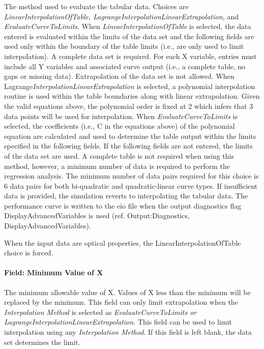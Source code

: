 The method used to evaluate the tabular data. Choices are \emph{LinearInterpolationOfTable, LagrangeInterpolationLinearExtrapolation,} and \emph{EvaluateCurveToLimits}. When \emph{LinearInterpolationOfTable} is selected, the data entered is evaluated within the limits of the data set and the following fields are used only within the boundary of the table limits (i.e., are only used to limit interpolation). A complete data set is required. For each X variable, entries must include all Y variables and associated curve output (i.e., a complete table, no gaps or missing data). Extrapolation of the data set is not allowed. When Lagrange\emph{InterpolationLinearExtrapolation} is selected, a polynomial interpolation routine is used within the table boundaries along with linear extrapolation. Given the valid equations above, the polynomial order is fixed at 2 which infers that 3 data points will be used for interpolation. When \emph{EvaluateCurveToLimits} is selected, the coefficients (i.e., C in the equations above) of the polynomial equation are calculated and used to determine the table output within the limits specified in the following fields. If the following fields are not entered, the limits of the data set are used. A complete table is not required when using this method, however, a minimum number of data is required to perform the regression analysis. The minimum number of data pairs required for this choice is 6 data pairs for both bi-quadratic and quadratic-linear curve types. If insufficient data is provided, the simulation reverts to interpolating the tabular data. The performance curve is written to the eio file when the output diagnostics flag DisplayAdvancedVariables is used (ref. Output:Diagnostics, DisplayAdvancedVariables).

When the input data are optical properties, the LinearInterpolationOfTable choice is forced.

\paragraph{Field: Minimum Value of X}\label{field-minimum-value-of-x-1-000}

The minimum allowable value of X. Values of X less than the minimum will be replaced by the minimum. This field can only limit extrapolation when the \emph{Interpolation Method} is selected as \emph{EvaluateCurveToLimits or LagrangeInterpolationLinearExtrapolation}. This field can be used to limit interpolation using any \emph{Interpolation Method}. If this field is left blank, the data set determines the limit.

